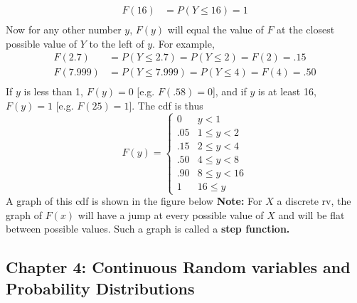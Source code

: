 \documentclass{report}
\begin{document}
\begin{itemize}
\[\begin{aligned}
                    F(16) &= P(Y \leq 16) = 1 \\
                \end{aligned}
            \]
            Now for any other number \( y \), \( F(y) \) will equal the value of \( F \) at the closest possible value of \( Y \) to the left of \( y \). For example,
            \[
                \begin{aligned}
                    F(2.7) &= P(Y \leq 2.7) = P(Y \leq 2) = F(2) = .15 \\
                    F(7.999) &= P(Y \leq 7.999) = P(Y \leq 4) = F(4) = .50 \\
                \end{aligned}
            \]
            \bigbreak \noindent 
            If \( y \) is less than 1, \( F(y) = 0 \) [e.g. \( F(.58) = 0 \)], and if \( y \) is at least 16, \( F(y) = 1 \) [e.g. \( F(25) = 1 \)]. The cdf is thus
            \[
                F(y) =
                \begin{cases} 
                    0 & y < 1 \\
                    .05 & 1 \leq y < 2 \\
                    .15 & 2 \leq y < 4 \\
                    .50 & 4 \leq y < 8 \\
                    .90 & 8 \leq y < 16 \\
                    1 & 16 \leq y
                \end{cases}
            \]
            A graph of this cdf is shown in the figure below
            \bigbreak \noindent 
            \bigbreak \noindent 
            \textbf{Note:} For $X$ a discrete rv, the graph of $F(x)$ will have a jump at every possible
            value of $X$ and will be flat between possible values. Such a graph is called a \textbf{step function.}

    \end{itemize}

    \pagebreak \bigbreak \noindent 
    \subsection{Chapter 4: Continuous Random variables and Probability Distributions}
    \bigbreak \noindent 
\end{document}

